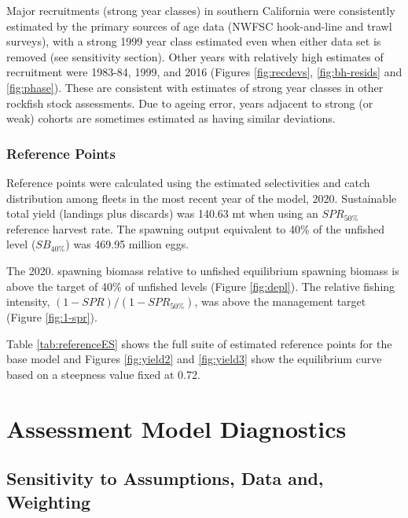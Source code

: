 \documentclass[
  english,
  a4paper,
]{article}
\begin{document}
Major recruitments (strong year classes) in southern California were consistently estimated by the primary sources of age data (NWFSC hook-and-line and trawl surveys), with a strong 1999 year class estimated even when either data set is removed (see sensitivity section). Other years with relatively high estimates of recruitment were 1983-84, 1999, and 2016 (Figures \ref{fig:recdevs}, \ref{fig:bh-resids} and \ref{fig:phase}). These are consistent with estimates of strong year classes in other rockfish stock assessments. Due to ageing error, years adjacent to strong (or weak) cohorts are sometimes estimated as having similar deviations.

\hypertarget{reference-points-1}{%
\subsubsection{Reference Points}\label{reference-points-1}}

Reference points were calculated using the estimated selectivities and catch distribution among fleets in the most recent year of the model, 2020.
Sustainable total yield (landings plus discards) was
140.63 mt when using an \(SPR_{50\%}\)
reference harvest rate. The spawning output equivalent to 40\% of the unfished level (\(SB_{40\%}\)) was 469.95
million eggs.

The 2020. spawning biomass relative to unfished equilibrium spawning biomass is above the target of 40\% of unfished levels (Figure \ref{fig:depl}).
The relative fishing intensity, \((1-SPR)/(1-SPR_{50\%})\), was above the management target (Figure \ref{fig:1-spr}).

Table \ref{tab:referenceES} shows the full suite of estimated reference points for the base model and Figures \ref{fig:yield2} and \ref{fig:yield3} show the equilibrium curve based on a steepness value fixed at 0.72.

\hypertarget{assessment-model-diagnostics}{%
\section{Assessment Model Diagnostics}\label{assessment-model-diagnostics}}

\hypertarget{sensitivity-to-assumptions-data-and-weighting}{%
\subsection{Sensitivity to Assumptions, Data and, Weighting}\label{sensitivity-to-assumptions-data-and-weighting}}
\end{document}
